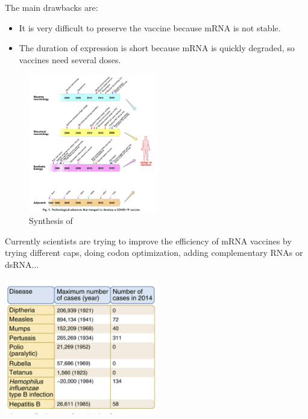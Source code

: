 \documentclass{article}
\begin{document}
            The main drawbacks are:
            \begin{itemize}
                \item It is very difficult to preserve the vaccine because mRNA is not stable.
                \item The duration of expression is short because mRNA is quickly degraded, so vaccines need several doses.
            \end{itemize}

            
            \begin{figure}
                \centering
                \includegraphics[width=0.5\textwidth]{imgs/Revolution.PNG}
                \caption{Synthesis of \autocite{rappuoliVaccinologyPostCOVID192021}}
                \label{fig:mRNAtypes}
            \end{figure}

            Currently scientists are trying to improve the efficiency of mRNA vaccines by trying different caps, doing codon optimization, adding complementary RNAs or dsRNA... \autocite{MRNATransformativeTechnology}


        
        \begin{center}
            \includegraphics[width=0.5\textwidth]{imgs/NumberOfCases.JPG}
        \end{center}
\end{document}
